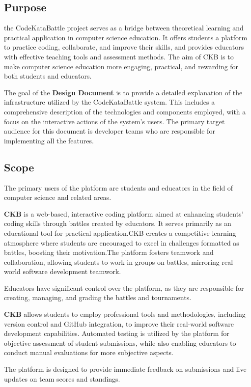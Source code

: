 \subsection{Purpose}
the CodeKataBattle project serves as a bridge between theoretical learning and practical application in computer science education. It offers students a platform to practice coding, collaborate, and improve their skills, and provides educators with effective teaching tools and assessment methods. The aim of CKB is to make computer science education more engaging, practical, and rewarding for both students and educators.

The goal of the \textbf{Design Document} is to provide a detailed explanation of the infrastructure utilized by the CodeKataBattle system. This includes a comprehensive description of the technologies and components employed, with a focus on the interactive actions of the system's users. The primary target audience for this document is developer teams who are responsible for implementing all the features.
\subsection{Scope}
The primary users of the platform are students and educators in the field of computer science and related areas.

\indent \textbf{CKB} is a web-based, interactive coding platform aimed at enhancing students' coding skills through battles created by educators. It serves primarily as an educational tool for practical application.CKB creates a competitive learning atmosphere where students are encouraged to excel in challenges formatted as battles, boosting their motivation.The platform fosters teamwork and collaboration, allowing students to work in groups on battles, mirroring real-world software development teamwork.

Educators have significant control over the platform, as they are responsible for creating, managing, and grading the battles and tournaments.

\indent \textbf{CKB} allows students to employ professional tools and methodologies, including version control and GitHub integration, to improve their real-world software development capabilities.
Automated testing is utilized by the platform for objective assessment of student submissions, while also enabling educators to conduct manual evaluations for more subjective aspects.

The platform is designed to provide immediate feedback on submissions and live updates on team scores and standings.

